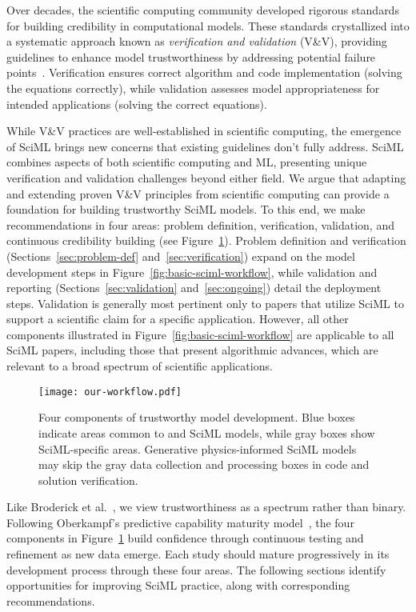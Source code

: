 Over decades, the scientific computing community developed rigorous standards for building credibility in computational models. These standards crystallized into a systematic approach known as \emph{verification and validation} (V\&V), providing guidelines to enhance model trustworthiness by addressing potential failure points~\cite{AIAA_validation_report_1998,VV10-2006,Oberkampf_T_PAS_2002}. 
Verification ensures correct algorithm and code implementation (solving the equations correctly), while validation assesses model appropriateness for intended applications (solving the correct equations).

While V\&V practices are well-established in scientific computing, the emergence of SciML brings new concerns that existing guidelines don't fully address. SciML combines aspects of both scientific computing and ML, presenting unique verification and validation challenges beyond either field. We argue that adapting and extending proven V\&V principles from scientific computing can provide a foundation for building trustworthy SciML models. 
To this end, we make recommendations in four areas: problem definition, verification, validation, and continuous credibility building (see Figure~\ref{fig:model-development}). 
Problem definition and verification (Sections~\ref{sec:problem-def} and~\ref{sec:verification}) expand on the model development steps in Figure~\ref{fig:basic-sciml-workflow},  while validation and reporting (Sections~\ref{sec:validation} and~\ref{sec:ongoing}) detail the deployment steps. Validation is generally most pertinent only to papers that utilize SciML to support a scientific claim for a specific application. However, all other components illustrated in Figure~\ref{fig:basic-sciml-workflow} are applicable to all SciML papers, including those that present algorithmic advances, which are relevant to a broad spectrum of scientific applications.

 \begin{figure}[htb]
    \centering
    \texttt{[image: our-workflow.pdf]}
    \caption{Four components of trustworthy model development. Blue boxes indicate areas common to \CSE{} and SciML models, while gray boxes show SciML-specific areas. Generative physics-informed SciML models may skip the gray data collection and processing boxes in code and solution verification.}
    \label{fig:model-development}
\end{figure}

Like Broderick et al.~\cite{Broderick_GMSZ_SA_2023}, we view trustworthiness as a spectrum rather than binary. Following Oberkampf's predictive capability maturity model~\cite{oberkampf2007predictive}, the four components in Figure~\ref{fig:model-development} build confidence through continuous testing and refinement as new data emerge. Each study should mature progressively in its development process through these four areas. The following sections identify opportunities for improving SciML practice, along with corresponding recommendations.
 
